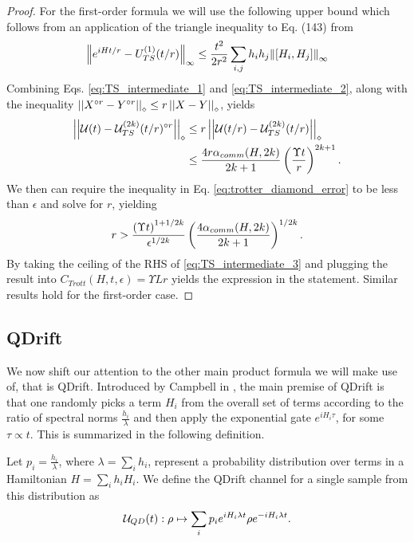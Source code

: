 \begin{proof}
    For the first-order formula we will use the following upper bound which follows from an application of the triangle inequality to Eq. (143) from \cite{childs2021theory}
    \begin{equation}
        \norm{e^{iHt/r} - {U_{TS}^{( 1 )}}(t/r)}_{\infty} \leq \frac{t^2}{2r^2} \sum_{i, j} h_i h_j \norm{[H_i, H_j]}_{\infty} 
    \end{equation}
    Combining Eqs. \eqref{eq:TS_intermediate_1} and \eqref{eq:TS_intermediate_2}, along with the inequality $\left| \left| X^{\circ r} - Y^{\circ r} \right| \right|_\diamond \leq r \left| \left| X - Y \right| \right|_\diamond$, yields
    \begin{align}
        \left| \left| \mathcal{U}(t) - {\mathcal{U}_{TS}^{( 2k )}}(t/r)^{\circ r} \right| \right|_\diamond &\leq r \left| \left| \mathcal{U}(t/r) - {\mathcal{U}_{TS}^{( 2k )}}(t/r) \right| \right|_\diamond \\
        &\leq \frac{4 r \alpha_{comm}(H, 2k)}{2k+1} \left( \frac{\Upsilon t}{r} \right)^{2k+1}. \label{eq:trotter_diamond_error}
    \end{align}
    We then can require the inequality in Eq. \eqref{eq:trotter_diamond_error} to be less than $\epsilon$ and solve for $r$, yielding 
    \begin{equation}
        r > \frac{\left( \Upsilon t \right)^{1+1/2k}}{\epsilon^{1/2k}} \left( \frac{4 \alpha_{comm}(H, 2k)}{2k+1} \right)^{1/2k}. \label{eq:TS_intermediate_3}
    \end{equation}
    By taking the ceiling of the RHS of \eqref{eq:TS_intermediate_3} and plugging the result into $C_{Trott}(H, t, \epsilon) = \Upsilon L r$ yields the expression in the statement. Similar results hold for the first-order case. 
\end{proof}

\subsection{QDrift}
We now shift our attention to the other main product formula we will make use of, that is QDrift. Introduced by Campbell in \cite{qdrift}, the main premise of QDrift is that one randomly picks a term $H_i$ from the overall set of terms according to the ratio of spectral norms $\frac{h_i}{\lambda}$ and then apply the exponential gate $e^{i H_i \tau}$, for some $\tau \propto t$. This is summarized in the following definition.
\begin{definition} \label{def:qdrift_channel}
    Let $p_i = \frac{h_i}{\lambda}$, where $\lambda = \sum_i h_i$, represent a probability distribution over terms in a Hamiltonian $H = \sum_i h_i H_i$. We define the QDrift channel for a single sample from this distribution as
    \begin{equation}
        \mathcal{U}_{QD}(t) : \rho \mapsto \sum_i p_i e^{i H_i \lambda t} \rho e^{- i H_i \lambda t}.
    \end{equation}
\end{definition}


